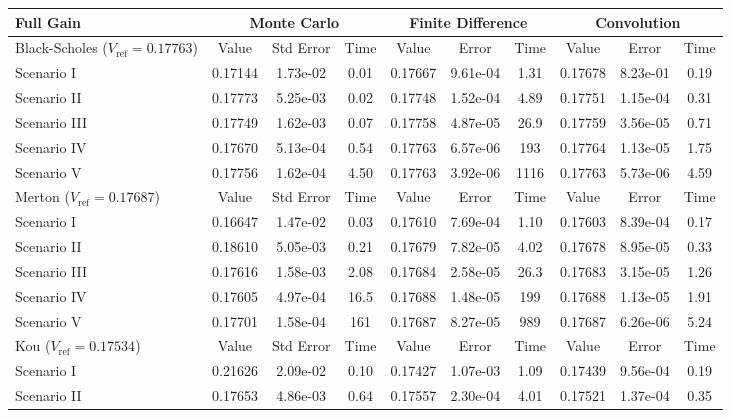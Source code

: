 \begin{table}
\centering
  \begin{tabular}{l||c|c|c||c|c|c||c|c|c}
    \toprule
    \textbf{Full Gain} & \multicolumn{3}{c||}{\textbf{Monte Carlo}} & \multicolumn{3}{c||}{\textbf{Finite Difference}} & \multicolumn{3}{c}{\textbf{Convolution}} \\
    \toprule
    Black-Scholes ($V_\text{ref}= 0.17763$) & Value & Std Error  & Time & Value & Error & Time & Value & Error & Time \\
      \midrule
    Scenario I   & 0.17144 & 1.73e-02 & 0.01 & 0.17667 & 9.61e-04 & 1.31 & 0.17678 & 8.23e-01 & 0.19\\
    Scenario II  & 0.17773 & 5.25e-03 & 0.02 & 0.17748 & 1.52e-04 & 4.89 & 0.17751 & 1.15e-04 & 0.31 \\
    Scenario III & 0.17749 & 1.62e-03 & 0.07 & 0.17758 & 4.87e-05 & 26.9 & 0.17759 & 3.56e-05 & 0.71 \\
    Scenario IV  & 0.17670 & 5.13e-04 & 0.54 & 0.17763 & 6.57e-06 & 193 & 0.17764 & 1.13e-05 & 1.75 \\
    Scenario V   & 0.17756 & 1.62e-04 & 4.50 & 0.17763 & 3.92e-06 & 1116 & 0.17763 & 5.73e-06 & 4.59 \\
     \midrule
      Merton ($V_\text{ref}=0.17687$) & Value & Std Error  & Time & Value & Error & Time & Value & Error & Time \\
      \midrule
    Scenario I   & 0.16647 & 1.47e-02 & 0.03 & 0.17610 & 7.69e-04 & 1.10 & 0.17603 & 8.39e-04 & 0.17 \\
    Scenario II  & 0.18610 & 5.05e-03 & 0.21 & 0.17679 & 7.82e-05 & 4.02 & 0.17678 & 8.95e-05 & 0.33 \\
    Scenario III & 0.17616 & 1.58e-03 & 2.08 & 0.17684 & 2.58e-05 & 26.3 & 0.17683 & 3.15e-05 & 1.26 \\
    Scenario IV  & 0.17605 & 4.97e-04 & 16.5 & 0.17688 & 1.48e-05 & 199 & 0.17688 & 1.13e-05 & 1.91 \\
    Scenario V   & 0.17701 & 1.58e-04 & 161  & 0.17687 & 8.27e-05 & 989 & 0.17687 & 6.26e-06 & 5.24 \\
     \midrule
      Kou ($V_\text{ref}=0.17534$) & Value & Std Error  & Time & Value & Error & Time & Value & Error & Time \\
      \midrule
    Scenario I   & 0.21626 & 2.09e-02 & 0.10 & 0.17427 & 1.07e-03 & 1.09 & 0.17439 & 9.56e-04 & 0.19 \\
    Scenario II  & 0.17653 & 4.86e-03 & 0.64 & 0.17557 & 2.30e-04 & 4.01 & 0.17521 & 1.37e-04 & 0.35 \\

\end{tabular}
\end{table}
